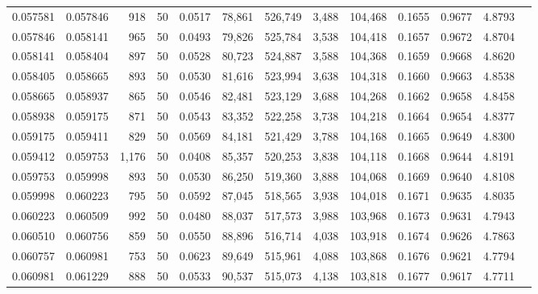 \begin{tabular}{rrrrrrrrrrrrr}
0.057581 & 0.057846 &   918 &  50 &                                     0.0517 &  78,861 & 526,749 &   3,488 & 104,468 & 0.1655 & 0.9677 & 4.8793 \\
0.057846 & 0.058141 &   965 &  50 &                                     0.0493 &  79,826 & 525,784 &   3,538 & 104,418 & 0.1657 & 0.9672 & 4.8704 \\
0.058141 & 0.058404 &   897 &  50 &                                     0.0528 &  80,723 & 524,887 &   3,588 & 104,368 & 0.1659 & 0.9668 & 4.8620 \\
0.058405 & 0.058665 &   893 &  50 &                                     0.0530 &  81,616 & 523,994 &   3,638 & 104,318 & 0.1660 & 0.9663 & 4.8538 \\
0.058665 & 0.058937 &   865 &  50 &                                     0.0546 &  82,481 & 523,129 &   3,688 & 104,268 & 0.1662 & 0.9658 & 4.8458 \\
0.058938 & 0.059175 &   871 &  50 &                                     0.0543 &  83,352 & 522,258 &   3,738 & 104,218 & 0.1664 & 0.9654 & 4.8377 \\
0.059175 & 0.059411 &   829 &  50 &                                     0.0569 &  84,181 & 521,429 &   3,788 & 104,168 & 0.1665 & 0.9649 & 4.8300 \\
0.059412 & 0.059753 & 1,176 &  50 &                                     0.0408 &  85,357 & 520,253 &   3,838 & 104,118 & 0.1668 & 0.9644 & 4.8191 \\
0.059753 & 0.059998 &   893 &  50 &                                     0.0530 &  86,250 & 519,360 &   3,888 & 104,068 & 0.1669 & 0.9640 & 4.8108 \\
0.059998 & 0.060223 &   795 &  50 &                                     0.0592 &  87,045 & 518,565 &   3,938 & 104,018 & 0.1671 & 0.9635 & 4.8035 \\
0.060223 & 0.060509 &   992 &  50 &                                     0.0480 &  88,037 & 517,573 &   3,988 & 103,968 & 0.1673 & 0.9631 & 4.7943 \\
0.060510 & 0.060756 &   859 &  50 &                                     0.0550 &  88,896 & 516,714 &   4,038 & 103,918 & 0.1674 & 0.9626 & 4.7863 \\
0.060757 & 0.060981 &   753 &  50 &                                     0.0623 &  89,649 & 515,961 &   4,088 & 103,868 & 0.1676 & 0.9621 & 4.7794 \\
0.060981 & 0.061229 &   888 &  50 &                                     0.0533 &  90,537 & 515,073 &   4,138 & 103,818 & 0.1677 & 0.9617 & 4.7711 \\

\end{tabular}
